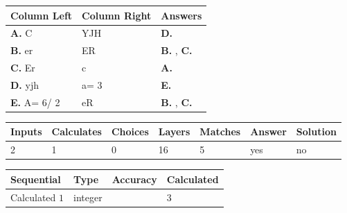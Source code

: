 \documentclass[12pt]{article}
\begin{document}
  
 
 
\noindent{}
  
  
\begin{tabular}{|l|l|l|}
 \hline
 Column Left & Column Right  & Answers       \\ 
 \hline
{\textbf{\large{
A.}}}
C
  & 
YJH
 & 
{\textbf{\large{
D.}}}
 \\ 
 \hline
{\textbf{\large{
B.}}}
er
  & 
ER
 & 
{\textbf{\large{
B.}}}
, 
{\textbf{\large{
C.}}}
 \\ 
 \hline
{\textbf{\large{
C.}}}
Er
  & 
c
 & 
{\textbf{\large{
A.}}}
 \\ 
 \hline
{\textbf{\large{
D.}}}
yjh
  & 
 a= %
3
 & 
{\textbf{\large{
E.}}}
 \\ 
 \hline
{\textbf{\large{
E.}}}
 A= %
6/ %
2

  & 
eR
 & 
{\textbf{\large{
B.}}}
, 
{\textbf{\large{
C.}}}
 \\ 
 \hline
 \end{tabular}
  
  
 
 
\noindent{}
 
 
 
   
   
   
   
\noindent\begin{tabular}{|l|l|l|l|l|l|l|}
 \hline
Inputs & Calculates & Choices & Layers & Matches & Answer & Solution \\ \hline
           2 & 
           1 & 
           0
  & 
          16 & 
           5 & 
  yes & 
  no 
  \\ \hline
 \end{tabular}
   
   
   
   
\noindent{}
   
   
  
  
\noindent\begin{tabular}{|l|l|l|l|}
\hline
 Sequential & Type & Accuracy & Calculated \\ 
\hline
 
 
  Calculated $           1$ & integer &  & 
  $ 3 $ 
 \\  \hline  
 \end{tabular}
   
\end{document}
